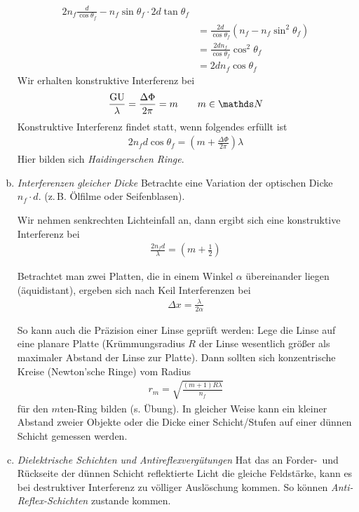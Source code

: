 \begin{enumerate}[a)]
\begin{align*}
        2 n_f\frac{d}{\cos\theta_f} - n_f\sin\theta_f \cdot 2d\tan\theta_f\\
      &= \frac{2d}{\cos\theta_f}\left( n_f-n_f\sin^2\theta_f\right)\\
      &= \frac{2dn_f}{\cos\theta_f}\cos^2\theta_f\\
      &= 2dn_f\cos\theta_f
\end{align*}
Wir erhalten konstruktive Interferenz bei
\begin{gather*}
  \frac{\GU}{\lambda} = \frac{\Delta\Phi}{2\pi} = m 
  \qquad m\in\N
\end{gather*}
Konstruktive Interferenz findet statt, wenn folgendes erfüllt ist
\begin{gather*}
  2n_f d\cos\theta_f = \left( m+\frac{\Delta\Phi}{2\pi} \right)\lambda
\end{gather*}
Hier bilden sich \emph{Haidingerschen Ringe}.

\item \emph{Interferenzen gleicher Dicke}
  Betrachte eine Variation der optischen Dicke $n_f\cdot d$.
  (z.\,B. Ölfilme oder Seifenblasen).

  Wir nehmen senkrechten Lichteinfall an, dann ergibt sich eine
  konstruktive Interferenz bei
  \begin{gather*}
    \frac{2 n_f d}{\lambda} = (m+\frac{1}{2})
  \end{gather*}

  Betrachtet man zwei Platten, die in einem Winkel $\alpha$ übereinander
  liegen (äquidistant), ergeben sich nach Keil Interferenzen bei
  \begin{gather*}
    \Delta x = \frac{\lambda}{2\alpha}
  \end{gather*}

  So kann auch die Präzision einer Linse geprüft werden: Lege die Linse
  auf eine planare Platte (Krümmungsradius $R$ der Linse wesentlich
  größer als maximaler Abstand der Linse zur Platte).
  Dann sollten sich konzentrische Kreise (Newton'sche Ringe) vom Radius
  \begin{gather*}
    r_m = \sqrt{\frac{(m+1)R\lambda}{n_f}}
  \end{gather*}
  für den $m$ten-Ring bilden (s. Übung).
  In gleicher Weise kann ein kleiner Abstand zweier Objekte oder die
  Dicke einer Schicht/Stufen auf einer dünnen Schicht gemessen werden.

\item \emph{Dielektrische Schichten und Antireflexvergütungen}
  Hat das an Forder-~und Rückseite der dünnen Schicht reflektierte Licht
  die gleiche Feldstärke, kann es bei destruktiver Interferenz zu
  völliger Auslöschung kommen. 
  So können \emph{Anti-Reflex-Schichten}
  zustande kommen.


\end{enumerate}
